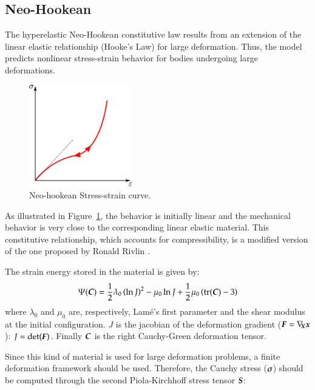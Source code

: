 \subsection{Neo-Hookean}

The hyperelastic Neo-Hookean constitutive law results from an
extension of the linear elastic relationship (Hooke's Law) for large
deformation. Thus, the model predicts nonlinear stress-strain behavior
for bodies undergoing large deformations.

\begin{figure}[!htb]
  \begin{center}
    \includegraphics[width=0.4\textwidth,keepaspectratio=true]{figures/stress_strain_neo.pdf}
    \caption{Neo-hookean Stress-strain curve.}
    \label{fig:smm:cl:neo_hookean}
  \end{center}
\end{figure}

As illustrated in Figure~\ref{fig:smm:cl:neo_hookean}, the behavior is initially
linear and the mechanical behavior is very close to the corresponding linear
elastic material. This constitutive relationship, which accounts for compressibility,
is a modified version of the one proposed by Ronald Rivlin \cite{Belytschko:2000}.

The strain energy stored in the material is given by:
\begin{equation}\label{eqn:smm:constitutive:neohookean_potential}
  \Psi(\boldsymbol{C}) = \frac{1}{2}\lambda_0\left(\ln J\right)^2-\mu_0\ln J+\frac{1}{2}
  \mu_0\left(\mathrm{tr}(\boldsymbol{C})-3\right)
\end{equation}
\noindent where $\lambda_0$ and $\mu_0$ are, respectively, Lamé's first parameter
and the shear modulus at the initial configuration. $J$ is the jacobian of the deformation
gradient ($\boldsymbol{F}=\nabla_{\!\!\boldsymbol{X}}\boldsymbol{x}$): $J=\text{det}(\boldsymbol{F})$. Finally $\boldsymbol{C}$ is the right Cauchy-Green
deformation tensor.

Since this kind of material is used for large deformation problems, a
finite deformation framework should be used. Therefore, the Cauchy
stress ($\boldsymbol{\sigma}$) should be computed through the second
Piola-Kirchhoff stress tensor $\boldsymbol{S}$:

